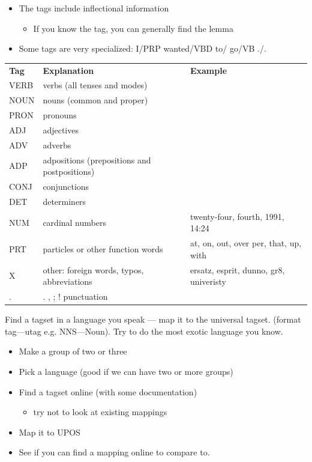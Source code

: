 \documentclass[a4paper,landscape,headrule,footrule,xetex]{foils}
\begin{document}
\begin{itemize}
\item The tags include inflectional information
  \begin{itemize}
  \item If you know the tag, you can generally find the lemma
  \end{itemize}
\item Some tags are very specialized: I/PRP wanted/VBD to/ go/VB ./.
\end{itemize}

{\small
\noindent\begin{tabular}{lll}
\textbf{Tag} & \textbf{Explanation} & \textbf{Example}\\
VERB & verbs (all tenses and modes) &   \\
NOUN & nouns (common and proper) &   \\
PRON & pronouns &   \\
ADJ & adjectives &   \\
ADV & adverbs &   \\
ADP & adpositions (prepositions and postpositions) &   \\
CONJ & conjunctions &   \\
DET & determiners &   \\
NUM & cardinal numbers & twenty-four, fourth, 1991, 14:24  \\
PRT & particles or other function words & at, on, out, over per, that, up, with  \\
X & other: foreign words, typos, abbreviations &  ersatz, esprit, dunno, gr8, univeristy \\
. & . , ; ! punctuation 
\end{tabular}
}



Find a tagset in a language you speak --- map it to the universal
tagset.  (format tag---utag e.g. NNS---Noun).  Try to do the most
exotic language you know.


\begin{itemize}
\item Make a group of two or three
\item Pick a language (good if we can have two or more groups)
\item Find a tagset online (with some documentation)
  \begin{itemize}
  \item try not to look at existing mappings
  \end{itemize}
\item Map it to UPOS
\item See if you can find a mapping online to compare to.
\end{itemize}
\end{document}
